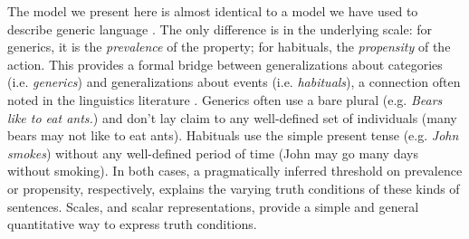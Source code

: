 \documentclass[10pt,letterpaper]{article}
\newcommand{\ndg}[1]{\textcolor{Green}{[ndg: #1]}}
\begin{document}

The model we present here is almost identical to a model we have used to describe generic language \cite{TesslerUnderReview}.
The only difference is in the underlying scale: for generics, it is the \emph{prevalence} of the property; for habituals, the \emph{propensity} of the action. 
This provides a formal bridge between generalizations about categories (i.e. \emph{generics}) and generalizations about events (i.e. \emph{habituals}), a connection often noted in the linguistics literature \cite{Carlson1977, Carlson2005, Cohen1999}. 
Generics often use a bare plural (e.g. \emph{Bears like to eat ants.}) and don't lay claim to any well-defined set of individuals (many bears may not like to eat ants).
Habituals use the simple present tense (e.g. \emph{John smokes}) without any well-defined period of time (John may go many days without smoking). 
In both cases, a pragmatically inferred threshold on prevalence or propensity, respectively, explains the varying truth conditions of these kinds of sentences.
Scales, and scalar representations, provide a simple and general quantitative way to express truth conditions.

\end{document}
